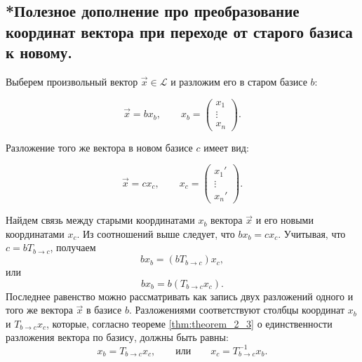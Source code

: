 \subsection{
    *Полезное дополнение про преобразование координат вектора при переходе от старого базиса к новому.
    \label{subsection:subsection_17_3}
}

Выберем произвольный вектор $\vec{x} \in \mathcal{L}$ и разложим его в старом базисе $b$:

$$\vec{x} = bx_b, \quad \quad x_b = \begin{pmatrix} x_1 \\ \vdots \\ x_n \end{pmatrix}.$$

Разложение того же вектора в новом базисе $c$ имеет вид:

$$\vec{x} = cx_c, \quad \quad x_c = \begin{pmatrix} x_1' \\ \vdots \\ x_n' \end{pmatrix}.$$

Найдем связь между старыми координатами $x_b$ вектора $\vec{x}$ и его новыми координатами $x_c$. Из соотношений выше следует, что $bx_b = cx_c$. Учитывая, что $c = bT_{b \to c}$, получаем 
$$bx_b = (bT_{b \to c})x_c,$$ или 
$$bx_b = b(T_{b \to c}x_c).$$ 
Последнее равенство можно рассматривать как запись двух разложений одного и того же вектора $\vec{x}$ в базисе $b$. Разложениями соответствуют столбцы координат $x_b$ и $T_{b \to c}x_c$, которые, согласно теореме \ref{thm:theorem_2_3} о единственности разложения вектора по базису, должны быть равны:
$$x_b = T_{b \to c}x_c, \quad \quad \text{или} \quad \quad x_c = T^{-1}_{b \to c}x_b.$$
